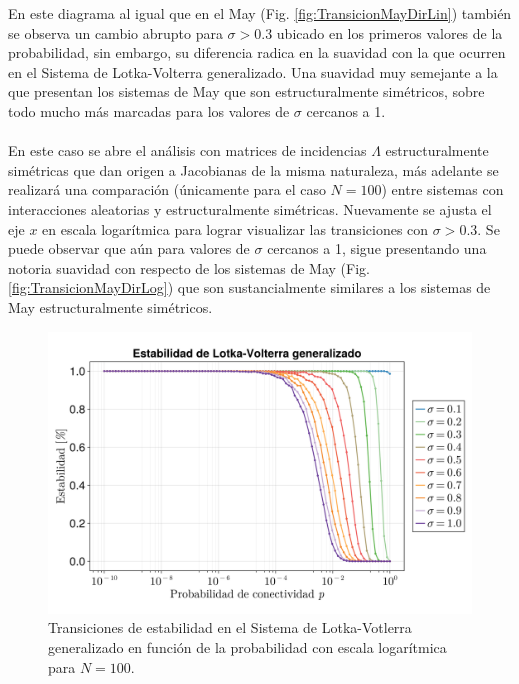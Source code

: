 En este diagrama al igual que en el May (Fig. \ref{fig:TransicionMayDirLin}) también se observa un cambio abrupto para $\sigma>0.3$ ubicado en los primeros valores de la probabilidad, sin embargo, su diferencia radica en la suavidad con la que ocurren en el Sistema de Lotka-Volterra generalizado. Una suavidad muy semejante a la que presentan los sistemas de May que son estructuralmente simétricos, sobre todo mucho más marcadas para los valores de $\sigma$ cercanos a 1. \\
\\
En este caso se abre el análisis con matrices de incidencias $\Lambda$ estructuralmente simétricas que dan origen a Jacobianas de la misma naturaleza, más adelante se realizará una comparación (únicamente para el caso $N=100$) entre sistemas con interacciones aleatorias y estructuralmente simétricas.
\newpage
Nuevamente se ajusta el eje $x$ en escala logarítmica para lograr visualizar las transiciones con $\sigma>0.3$. Se puede observar que aún para valores de $\sigma$ cercanos a 1, sigue presentando una notoria suavidad con respecto de los sistemas de May (Fig. \ref{fig:TransicionMayDirLog}) que son sustancialmente similares a los sistemas de May estructuralmente simétricos.
\begin{figure}[h!]
	\centering
	\includegraphics[scale=0.2]{../Imagenes/EstabilidadLKpLog}
	\caption{Transiciones de estabilidad en el Sistema de Lotka-Votlerra generalizado en función de la probabilidad con escala logarítmica para $N=100$.}
	\label{fig:EstabilidadLKpLog}
\end{figure}

